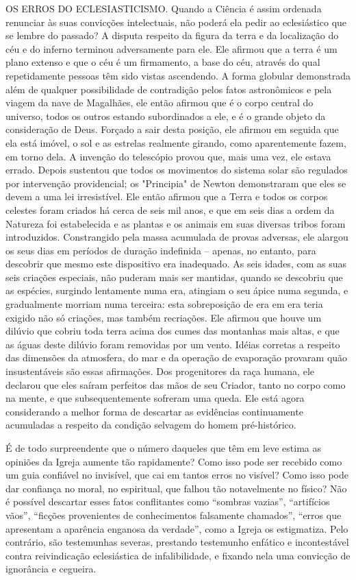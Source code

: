 \documentclass[11pt,a5paper,twoside,openany]{book}
\begin{document}
OS ERROS DO ECLESIASTICISMO. Quando a Ciência é assim ordenada renunciar às suas convicções intelectuais, não poderá ela pedir ao eclesiástico que se lembre do passado? A disputa respeito da figura da terra e da localização do céu e do inferno terminou adversamente para ele. Ele afirmou que a terra é um plano extenso e que o céu é um firmamento, a base do céu, através do qual repetidamente pessoas têm sido vistas ascendendo. A forma globular demonstrada além de qualquer possibilidade de contradição pelos fatos astronômicos e pela viagem da nave de Magalhães, ele então afirmou que é o corpo central do universo, todos os outros estando subordinados a ele, e é o grande objeto da consideração de Deus. Forçado a sair desta posição, ele afirmou em seguida que ela está imóvel, o sol e as estrelas realmente girando, como aparentemente fazem, em torno dela. A invenção do telescópio provou que, mais uma vez, ele estava errado. Depois sustentou que todos os movimentos do sistema solar são regulados por intervenção providencial; os "Principia" de Newton demonstraram que eles se devem a uma lei irresistível. Ele então afirmou que a Terra e todos os corpos celestes foram criados há cerca de seis mil anos, e que em seis dias a ordem da Natureza foi estabelecida e as plantas e os animais em suas diversas tribos foram introduzidos. Constrangido pela massa acumulada de provas adversas, ele alargou os seus dias em períodos de duração indefinida – apenas, no entanto, para descobrir que mesmo este dispositivo era inadequado. As seis idades, com as suas seis criações especiais, não puderam mais ser mantidas, quando se descobriu que as espécies, surgindo lentamente numa era, atingiam o seu ápice numa segunda, e gradualmente morriam numa terceira: esta sobreposição de era em era teria exigido não só criações, mas também recriações. Ele afirmou que houve um dilúvio que cobriu toda terra acima dos cumes das montanhas mais altas, e que as águas deste dilúvio foram removidas por um vento. Idéias corretas a respeito das dimensões da atmosfera, do mar e da operação de evaporação provaram quão insustentáveis ​​são essas afirmações. Dos progenitores da raça humana, ele declarou que eles saíram perfeitos das mãos de seu Criador, tanto no corpo como na mente, e que subsequentemente sofreram uma queda. Ele está agora considerando a melhor forma de descartar as evidências continuamente acumuladas a respeito da condição selvagem do homem pré-histórico.

É de todo surpreendente que o número daqueles que têm em leve estima as opiniões da Igreja aumente tão rapidamente? Como isso pode ser recebido como um guia confiável no invisível, que cai em tantos erros no visível? Como isso pode dar confiança no moral, no espiritual, que falhou tão notavelmente no físico? Não é possível descartar esses fatos conflitantes como “sombras vazias”, “artifícios vãos”, “ficções provenientes de conhecimentos falsamente chamados”, “erros que apresentam a aparência enganosa da verdade”, como a Igreja os estigmatiza. Pelo contrário, são testemunhas severas, prestando testemunho enfático e incontestável contra reivindicação eclesiástica de infalibilidade, e fixando nela uma convicção de ignorância e cegueira.
\end{document}

